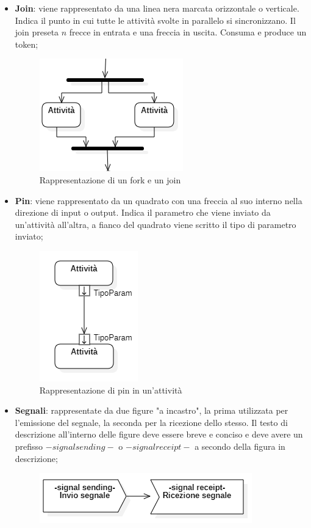 \begin{itemize}
	\item \textbf{Join}: viene rappresentato da una linea nera marcata orizzontale o verticale. Indica il punto in cui tutte le attività svolte in parallelo si sincronizzano. Il join preseta $n$ frecce in entrata e una freccia in uscita. Consuma e produce un token;
		\begin{figure}[H]
		\centering\includegraphics{../immagini/normeUML/forkJoin.png}
		\caption{Rappresentazione di un fork e un join}
	\end{figure}
	\item \textbf{Pin}: viene rappresentato da un quadrato con una freccia al suo interno nella direzione di input o output. Indica il parametro che viene inviato da un'attività all'altra, a fianco del quadrato viene scritto il tipo di parametro inviato;
		\begin{figure}[H]
		\centering\includegraphics{../immagini/normeUML/pin.png}
		\caption{Rappresentazione di pin in un'attività}
	\end{figure}
	\item \textbf{Segnali}: rappresentate da due figure "a incastro", la prima utilizzata per l'emissione del segnale, la seconda per la ricezione dello stesso. Il testo di descrizione all'interno delle figure deve essere breve e conciso e deve avere un prefisso $-signal sending-$ o $-signal receipt-$ a secondo della figura in descrizione;
		\begin{figure}[H]
		\centering\includegraphics{../immagini/normeUML/signal.png}

\end{figure}
\end{itemize}
